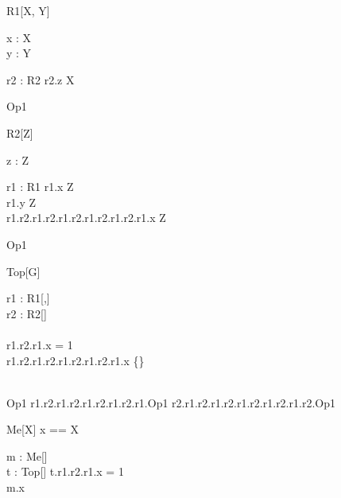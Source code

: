 \begin{class}{R1[X, Y]}
  \begin{axdef}
    x : X\\
    y : Y
  \end{axdef}
  \begin{state}
    r2 : R2
  \where
    r2.z \in X\\
  \end{state}
  Op1 \sdef [x? : \nat]
\end{class}

\begin{class}{R2[Z]}
  \begin{axdef}
    z : Z
  \end{axdef}
  \begin{state}
   r1 : R1
  \where
    r1.x \in Z\\
    r1.y \in \finset Z\\
    r1.r2.r1.r2.r1.r2.r1.r2.r1.r2.r1.x \in Z
  \end{state}
  Op1 \sdef [x? : \nat]
\end{class} 

\begin{class}{Top[G]}
  \begin{state}
    r1 : R1[\nat,\nat]\\
    r2 : R2[\finset\finset\nat]\\
  \where\\
    r1.r2.r1.x = 1\\
   r1.r2.r1.r2.r1.r2.r1.r2.r1.x \in \{\}\\
  \end{state}\\
  Op1 \sdef  r1.r2.r1.r2.r1.r2.r1.r2.r1.Op1 \land
            r2.r1.r2.r1.r2.r1.r2.r1.r2.r1.r2.Op1
\end{class}

\begin{class}{Me[X]}
  x == X
  \begin{state} 
   m :  Me[\nat]\\
   t : Top[\nat]
  \where
    t.r1.r2.r1.x = 1\\
    m.x \in \finset \nat
  \end{state}
\end{class}


